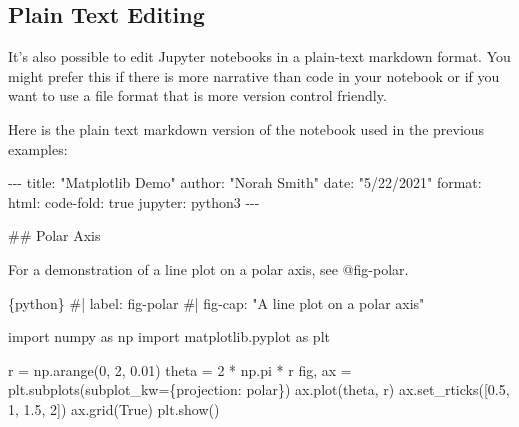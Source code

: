 \documentclass[
  letterpaper,
  DIV=11,
  numbers=noendperiod,
  oneside]{scrreprt}
\newenvironment{Shaded}{\begin{snugshade}}{\end{snugshade}}
\newcommand{\AnnotationTok}[1]{\textcolor[rgb]{0.37,0.37,0.37}{#1}}
\newcommand{\CommentTok}[1]{\textcolor[rgb]{0.37,0.37,0.37}{#1}}
\newcommand{\DecValTok}[1]{\textcolor[rgb]{0.68,0.00,0.00}{#1}}
\newcommand{\FloatTok}[1]{\textcolor[rgb]{0.68,0.00,0.00}{#1}}
\newcommand{\FunctionTok}[1]{\textcolor[rgb]{0.28,0.35,0.67}{#1}}
\newcommand{\ImportTok}[1]{\textcolor[rgb]{0.00,0.46,0.62}{#1}}
\newcommand{\InformationTok}[1]{\textcolor[rgb]{0.37,0.37,0.37}{#1}}
\newcommand{\NormalTok}[1]{\textcolor[rgb]{0.00,0.23,0.31}{#1}}
\newcommand{\OperatorTok}[1]{\textcolor[rgb]{0.37,0.37,0.37}{#1}}
\newcommand{\StringTok}[1]{\textcolor[rgb]{0.13,0.47,0.30}{#1}}
\newcommand{\VariableTok}[1]{\textcolor[rgb]{0.07,0.07,0.07}{#1}}
\begin{document}
\begin{tcolorbox}
\section{Plain Text Editing}\label{plain-text-editing}

It's also possible to edit Jupyter notebooks in a plain-text markdown
format. You might prefer this if there is more narrative than code in
your notebook or if you want to use a file format that is more version
control friendly.

Here is the plain text markdown version of the notebook used in the
previous examples:

\begin{Shaded}
\begin{Highlighting}[]
\CommentTok{{-}{-}{-}}
\AnnotationTok{title:}\CommentTok{ "Matplotlib Demo"}
\AnnotationTok{author:}\CommentTok{ "Norah Smith"}
\AnnotationTok{date:}\CommentTok{ "5/22/2021"}
\AnnotationTok{format:}\CommentTok{ }
\CommentTok{  html:}
\CommentTok{    code{-}fold: true}
\AnnotationTok{jupyter:}\CommentTok{ python3}
\CommentTok{{-}{-}{-}}

\FunctionTok{\#\# Polar Axis}

\NormalTok{For a demonstration of a line plot on a polar axis, see @fig{-}polar.}

\InformationTok{\textasciigrave{}\textasciigrave{}\textasciigrave{}\{python\}}
\CommentTok{\#| label: fig{-}polar}
\CommentTok{\#| fig{-}cap: "A line plot on a polar axis"}

\ImportTok{import}\NormalTok{ numpy }\ImportTok{as}\NormalTok{ np}
\ImportTok{import}\NormalTok{ matplotlib.pyplot }\ImportTok{as}\NormalTok{ plt}

\NormalTok{r }\OperatorTok{=}\NormalTok{ np.arange(}\DecValTok{0}\NormalTok{, }\DecValTok{2}\NormalTok{, }\FloatTok{0.01}\NormalTok{)}
\NormalTok{theta }\OperatorTok{=} \DecValTok{2} \OperatorTok{*}\NormalTok{ np.pi }\OperatorTok{*}\NormalTok{ r}
\NormalTok{fig, ax }\OperatorTok{=}\NormalTok{ plt.subplots(subplot\_kw}\OperatorTok{=}\NormalTok{\{}\StringTok{\textquotesingle{}projection\textquotesingle{}}\NormalTok{: }\StringTok{\textquotesingle{}polar\textquotesingle{}}\NormalTok{\})}
\NormalTok{ax.plot(theta, r)}
\NormalTok{ax.set\_rticks([}\FloatTok{0.5}\NormalTok{, }\DecValTok{1}\NormalTok{, }\FloatTok{1.5}\NormalTok{, }\DecValTok{2}\NormalTok{])}
\NormalTok{ax.grid(}\VariableTok{True}\NormalTok{)}
\NormalTok{plt.show()}
\InformationTok{\textasciigrave{}\textasciigrave{}\textasciigrave{}}
\end{Highlighting}
\end{Shaded}


\end{tcolorbox}
\end{document}
